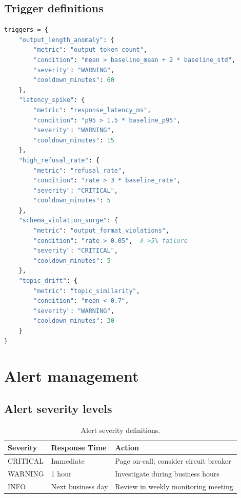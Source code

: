 \subsection{Trigger definitions}

\begin{lstlisting}[language=Python,basicstyle=\ttfamily\small,caption={Detection trigger configuration.}]
triggers = {
    "output_length_anomaly": {
        "metric": "output_token_count",
        "condition": "mean > baseline_mean + 2 * baseline_std",
        "severity": "WARNING",
        "cooldown_minutes": 60
    },
    "latency_spike": {
        "metric": "response_latency_ms",
        "condition": "p95 > 1.5 * baseline_p95",
        "severity": "WARNING",
        "cooldown_minutes": 15
    },
    "high_refusal_rate": {
        "metric": "refusal_rate",
        "condition": "rate > 3 * baseline_rate",
        "severity": "CRITICAL",
        "cooldown_minutes": 5
    },
    "schema_violation_surge": {
        "metric": "output_format_violations",
        "condition": "rate > 0.05",  # >5% failure
        "severity": "CRITICAL",
        "cooldown_minutes": 5
    },
    "topic_drift": {
        "metric": "topic_similarity",
        "condition": "mean < 0.7",
        "severity": "WARNING",
        "cooldown_minutes": 30
    }
}
\end{lstlisting}

\section{Alert management}

\subsection{Alert severity levels}

\begin{table}[htbp]
\centering
\caption{Alert severity definitions.}
\label{tab:alert-severity}
\footnotesize
\begin{tabularx}{\linewidth}{@{}l l X@{}}
\toprule
\textbf{Severity} & \textbf{Response Time} & \textbf{Action} \\ \midrule
CRITICAL & Immediate & Page on-call; consider circuit breaker \\
WARNING & 1 hour & Investigate during business hours \\
INFO & Next business day & Review in weekly monitoring meeting \\
\bottomrule
\end{tabularx}
\end{table}

